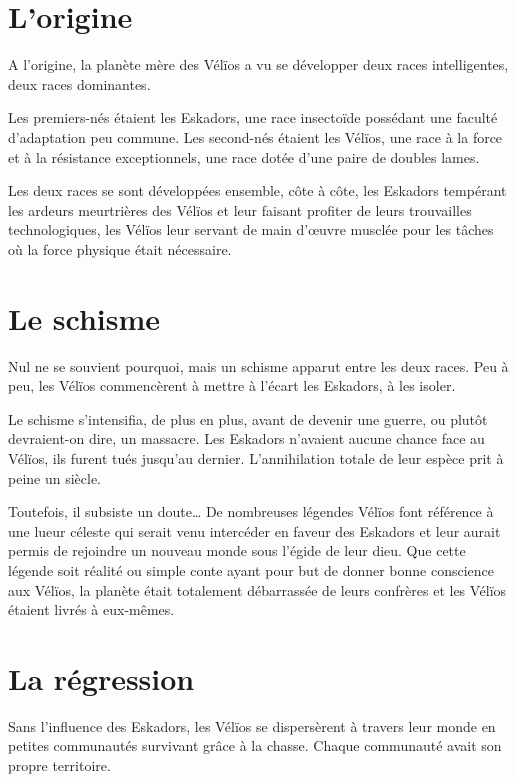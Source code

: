 \begin{multicols*}{2}

\section{L’origine}

A l’origine, la planète mère des Vélïos a vu se développer deux races intelligentes, deux races dominantes. 

Les premiers-nés étaient les Eskadors, une race insectoïde possédant une faculté d’adaptation peu commune. Les second-nés étaient les Vélïos, une race à la force et à la résistance exceptionnels, une race dotée d’une paire de doubles lames.

Les deux races se sont développées ensemble, côte à côte, les Eskadors tempérant les ardeurs meurtrières des Vélïos et leur faisant profiter de leurs trouvailles technologiques, les Vélïos leur servant de main d’œuvre musclée pour les tâches où la force physique était nécessaire.

\section{Le schisme}

Nul ne se souvient pourquoi, mais un schisme apparut entre les deux races. Peu à peu, les Vélïos commencèrent à mettre à l’écart les Eskadors, à les isoler.

Le schisme s’intensifia, de plus en plus, avant de devenir une guerre, ou plutôt devraient-on dire, un massacre. Les Eskadors n’avaient aucune chance face au Vélïos, ils furent tués jusqu’au dernier. L’annihilation totale de leur espèce prit à peine un siècle.

Toutefois, il subsiste un doute… De nombreuses légendes Vélïos font référence à une lueur céleste qui serait venu intercéder en faveur des Eskadors et leur aurait permis de rejoindre un nouveau monde sous l’égide de leur dieu. Que cette légende soit réalité ou simple conte ayant pour but de donner bonne conscience aux Vélïos, la planète était totalement débarrassée de leurs confrères et les Vélïos étaient livrés à eux-mêmes.

\section{La régression}

Sans l’influence des Eskadors, les Vélïos se dispersèrent à travers leur monde en petites communautés survivant grâce à la chasse. Chaque communauté avait son propre territoire.


\end{multicols*}
